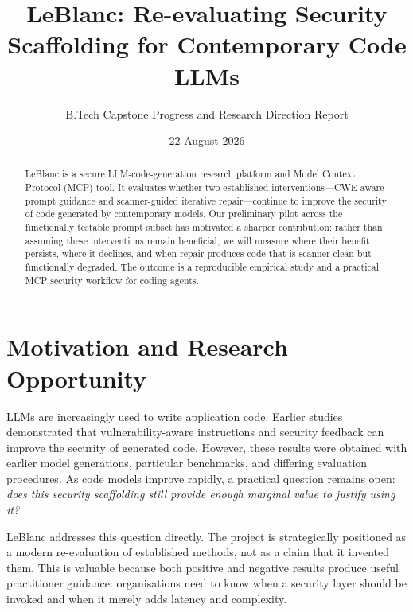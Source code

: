 \documentclass[11pt,a4paper]{article}
\title{LeBlanc: Re-evaluating Security Scaffolding for Contemporary Code LLMs}
\author{B.Tech Capstone Progress and Research Direction Report}
\date{22 August 2026}
\begin{document}
\maketitle

\begin{abstract}
LeBlanc is a secure LLM-code-generation research platform and Model Context Protocol (MCP) tool. It evaluates whether two established interventions---CWE-aware prompt guidance and scanner-guided iterative repair---continue to improve the security of code generated by contemporary models. Our preliminary pilot across the functionally testable prompt subset has motivated a sharper contribution: rather than assuming these interventions remain beneficial, we will measure where their benefit persists, where it declines, and when repair produces code that is scanner-clean but functionally degraded. The outcome is a reproducible empirical study and a practical MCP security workflow for coding agents.
\end{abstract}

\section{Motivation and Research Opportunity}
LLMs are increasingly used to write application code. Earlier studies demonstrated that vulnerability-aware instructions and security feedback can improve the security of generated code. However, these results were obtained with earlier model generations, particular benchmarks, and differing evaluation procedures. As code models improve rapidly, a practical question remains open: \emph{does this security scaffolding still provide enough marginal value to justify using it?}

LeBlanc addresses this question directly. The project is strategically positioned as a modern re-evaluation of established methods, not as a claim that it invented them. This is valuable because both positive and negative results produce useful practitioner guidance: organisations need to know when a security layer should be invoked and when it merely adds latency and complexity.
\end{document}
